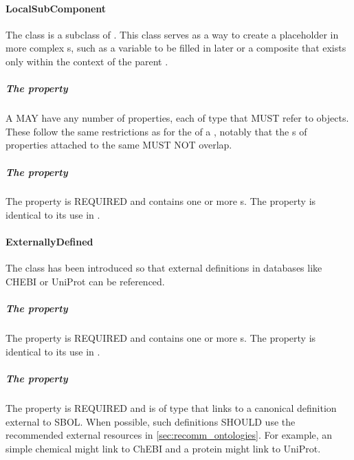 \paragraph{LocalSubComponent}
\label{sec:LocalSubComponent}

The  class is a subclass of . 
This class serves as a way to create a placeholder in more complex s, such as a variable to be filled in later or a composite that exists only within the context of the parent .

\subparagraph{The  property}\label{sec:hasLocation:LSR}

A  MAY have any number of  properties, each of type  that MUST refer to  objects. 
These follow the same restrictions as for the  of a , notably that the s of  properties attached to the same  MUST NOT overlap.


\subparagraph{The  property}\label{sec:type:LSC}

The  property is REQUIRED and contains one or more s. The  property is identical to its use in .

\paragraph{ExternallyDefined}
\label{sec:ExternallyDefined}

The  class has been introduced so that external definitions in databases like CHEBI or UniProt can be referenced.

\subparagraph{The  property}\label{sec:type:ED}

The  property is REQUIRED and contains one or more s. The  property is identical to its use in .

\subparagraph{The  property}\label{sec:definition:ER}

The  property is REQUIRED and is of type  that links to a canonical definition external to SBOL.
When possible, such definitions SHOULD use the recommended external resources in \ref{sec:recomm_ontologies}.
For example, an  simple chemical might link to ChEBI and a protein might link to UniProt.


